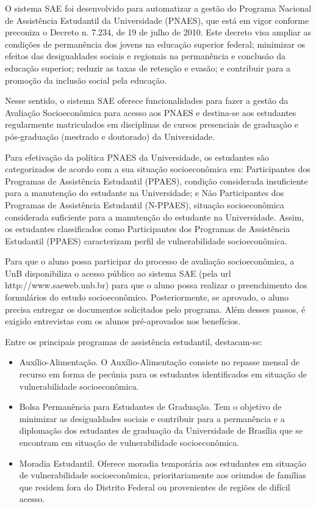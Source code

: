 \label{compreensao_sae}

O sistema \acrshort{SAE} foi desenvolvido para automatizar a gestão do Programa Nacional de Assistência Estudantil da Universidade (PNAES), que está em vigor conforme preconiza o Decreto n. 7.234, de 19 de julho de 2010. 
Este decreto visa ampliar as condições de permanência dos jovens na educação superior federal; minimizar os efeitos das desigualdades sociais e regionais na permanência e conclusão da educação superior; reduzir as taxas de retenção e evasão; e contribuir para a promoção da inclusão social pela educação.

Nesse sentido, o sistema \acrshort{SAE} oferece funcionalidades para fazer a gestão da Avaliação Socioeconômica para acesso aos PNAES e destina-se aos estudantes regularmente matriculados em disciplinas de cursos presenciais de graduação e pós-graduação (mestrado e doutorado) da Universidade.

Para efetivação da política PNAES da Universidade, os estudantes são categorizados de acordo com a sua situação socioeconômica em: Participantes dos Programas de Assistência Estudantil (PPAES), condição considerada insuficiente para a manutenção do estudante na Universidade; e Não Participantes dos Programas de Assistência Estudantil (N-PPAES), situação socioeconômica considerada suficiente para a manutenção do estudante na Universidade. Assim, os estudantes classificados como Participantes dos Programas de Assistência Estudantil (PPAES) caracterizam perfil de vulnerabilidade socioeconômica.

Para que o aluno possa participar do processo de avaliação socioeconômica, a \acrshort{UnB} disponibiliza o acesso público ao sistema \acrshort{SAE} (pela url http://www.saeweb.unb.br) para que o aluno possa realizar o preenchimento dos formulários do estudo socioeconômico. Posteriormente, se aprovado, o aluno precisa entregar os documentos solicitados pelo programa. Além desses passos, é exigido entrevistas com os alunos pré-aprovados nos benefícios.

Entre os principais programas de assistência estudantil, destacam-se:

\begin{itemize}

\item Auxílio-Alimentação. O Auxílio-Alimentação consiste no repasse mensal de recurso em forma de pecúnia para os estudantes identificados em situação de vulnerabilidade socioeconômica.

\item Bolsa Permanência para Estudantes de Graduação. Tem o objetivo de minimizar as desigualdades sociais e contribuir para a permanência e a diplomação dos estudantes de graduação da Universidade de Brasília que se encontram em situação de vulnerabilidade socioeconômica. 

\item Moradia Estudantil. Oferece moradia temporária aos estudantes em situação de vulnerabilidade socioeconômica, prioritariamente aos oriundos de famílias que residem fora do Distrito Federal ou provenientes de regiões de difícil acesso.

\end{itemize}

